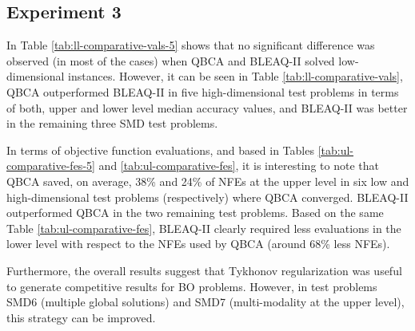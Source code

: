 \documentclass[conference]{IEEEtran}
\theoremstyle{definition}
\begin{document}
\subsection{Experiment 3}
In Table \ref{tab:ll-comparative-vals-5} shows that no significant difference was
observed (in most of the cases) when QBCA and BLEAQ-II solved low-dimensional
instances. However, it can be seen in Table \ref{tab:ll-comparative-vals}, QBCA
outperformed BLEAQ-II in five high-dimensional test problems in terms of both,
upper and lower level median accuracy values, and BLEAQ-II was better in the remaining
three SMD test problems. 

In terms of objective function evaluations, and based in Tables \ref{tab:ul-comparative-fes-5}
and \ref{tab:ul-comparative-fes}, it is interesting to note that QBCA saved, on
average, 38\% and 24\% of NFEs at the upper level in six low and high-dimensional
test problems (respectively) where QBCA converged. BLEAQ-II outperformed QBCA in
the two remaining test problems. Based on the same Table \ref{tab:ul-comparative-fes},
BLEAQ-II clearly required less evaluations in the lower level with respect to the
NFEs used by QBCA (around 68\% less NFEs). 

Furthermore, the overall results suggest that Tykhonov regularization was useful
to generate competitive results for BO problems. However, in test problems SMD6
(multiple global solutions) and SMD7 (multi-modality at the upper level), this
strategy can be improved.


\end{document}
